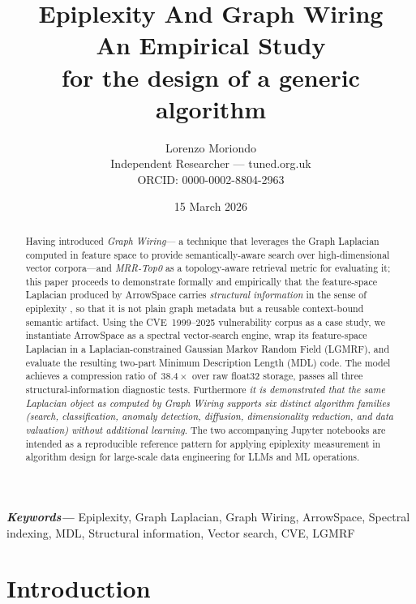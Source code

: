 \documentclass[12pt,a4paper]{article}
\title{%
	\textbf{Epiplexity And Graph Wiring\\
		An Empirical Study\\ for the design of a generic algorithm}
}
\author{Lorenzo Moriondo\\
	\small Independent Researcher --- tuned.org.uk\\
	\small ORCID: 0000-0002-8804-2963}
\date{15 March 2026}
\providecommand{\keywords}[1]{\textbf{\textit{Keywords---}} #1}
\theoremstyle{plain}
\theoremstyle{definition}
\theoremstyle{remark}
\newcommand{\1}{\mathbf{1}}
\begin{document}
	\maketitle
	
	\begin{abstract}
		Having introduced \emph{Graph Wiring}---\citep{graphwiring2025} a technique that leverages the
		Graph Laplacian computed in feature space to provide semantically-aware
		search over high-dimensional vector corpora---and \emph{MRR-Top0} \citep{mrrtop02025} as a topology-aware retrieval metric for evaluating it; this paper proceeds to demonstrate formally and empirically that the feature-space Laplacian
		produced by ArrowSpace \citep{Moriondo2025ArrowSpace} carries \emph{structural information} in the sense of epiplexity \citep{finzi2026epiplexity}, so that it is not plain graph metadata but a reusable context-bound semantic artifact.
		Using the CVE~1999--2025 vulnerability corpus as a case study, we
		instantiate ArrowSpace as a spectral vector-search engine, wrap its
		feature-space Laplacian in a Laplacian-constrained Gaussian Markov
		Random Field (LGMRF), and evaluate the resulting two-part Minimum
		Description Length (MDL) code.
		The model achieves a compression ratio of~$38.4\times$ over raw float32
		storage, passes all three structural-information diagnostic tests. Furthermore
		\emph{it is demonstrated that the same Laplacian object as computed by Graph Wiring supports six distinct algorithm families
		(search, classification, anomaly detection, diffusion, dimensionality
		reduction, and data valuation) without additional learning}.
		The two accompanying Jupyter notebooks are intended as a reproducible
		reference pattern for applying epiplexity measurement in algorithm design
		for large-scale data engineering for LLMs and ML operations.
	\end{abstract}
	
	\keywords{Epiplexity, Graph Laplacian, Graph Wiring, ArrowSpace,
		Spectral indexing, MDL, Structural information, Vector search,
		CVE, LGMRF}
	
	\section{Introduction}
	\label{sec:intro}
	
\end{document}
